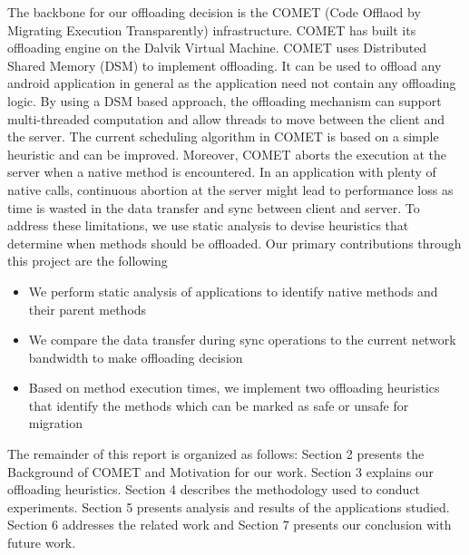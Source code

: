 The backbone for our offloading decision is the COMET (Code Offlaod by Migrating Execution Transparently)
infrastructure. COMET has built its offloading engine
on the Dalvik Virtual Machine. COMET uses Distributed Shared Memory (DSM) to implement offloading. It can be used to offload
any android application in general as the application need not contain any offloading logic. By using a DSM based approach, the
offloading mechanism can support multi-threaded computation and allow threads to move between the client and the server.
The current scheduling algorithm in COMET is based on a simple heuristic and can be improved. Moreover, COMET aborts the
execution at the server when a native method is encountered. In an application with plenty of native calls, continuous abortion
at the server might lead to performance loss as time is wasted in the data transfer and sync between client and server.
To address these limitations, we use static analysis to devise heuristics that determine when methods should be offloaded.
\newline
\newline
Our primary contributions through this project are the following
\begin{itemize}
   \item We perform static analysis of applications to identify native methods and their parent methods
   \item We compare the data transfer during sync operations to the current network bandwidth to make offloading decision
   \item Based on method execution times, we implement two offloading heuristics that identify the methods which can be marked
   as safe or unsafe for migration
\end{itemize}
\vspace{2mm}
The remainder of this report is organized as follows: Section 2 presents the Background of COMET and Motivation for our work.
Section 3 explains our offloading heuristics. Section 4 describes the methodology used to conduct experiments. Section 5 presents
analysis and results of the applications studied. Section 6 addresses the related work and Section 7 presents our conclusion with
future work.
